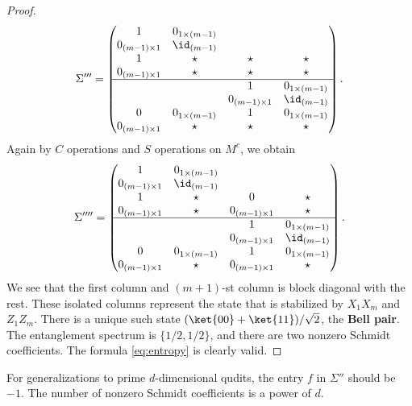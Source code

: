 \begin{proof}
\begin{align*}
 \Sigma''' =
\begin{pmatrix}
1                  & 0_{1 \times (m-1)} &  &  \\
0_{(m-1) \times 1} & \id_{(m-1)}        &  &  \\
1              & \star & \star & \star \\
0_{(m-1) \times 1} & \star        & \star & \star \\
\hline
 &  & 1 & 0_{1 \times (m-1)} \\
 &  & 0_{(m-1) \times 1} & \id_{(m-1)}\\
0              & 0_{1 \times (m-1)} & 1 & 0_{1 \times (m-1)} \\
0_{(m-1)\times 1} & \star        & \star & \star
\end{pmatrix}.
\end{align*}
Again by $C$ operations and $S$ operations on $M^c$, we obtain
\begin{align*}
 \Sigma'''' =
\begin{pmatrix}
1                  & 0_{1 \times (m-1)} &  &  \\
0_{(m-1) \times 1} & \id_{(m-1)}        &  &  \\
1              & \star & 0 & \star \\
0_{(m-1) \times 1} & \star        & 0_{(m-1) \times 1} & \star \\
\hline
 &  & 1 & 0_{1 \times (m-1)} \\
 &  & 0_{(m-1) \times 1} & \id_{(m-1)}\\
0              & 0_{1 \times (m-1)} & 1 & 0_{1 \times (m-1)} \\
0_{(m-1)\times 1} & \star        & 0_{(m-1) \times 1} & \star
\end{pmatrix}.
\end{align*}
We see that the first column and $(m+1)$-st column
is block diagonal with the rest.
These isolated columns represent the state that is stabilized by $X_1 X_m$ and $Z_1 Z_m$.
There is a unique such state $(\ket{00} + \ket{11})/\sqrt{2}$, the {\bf Bell pair}.
The entanglement spectrum is $\{1/2,1/2\}$, and there are two nonzero Schmidt coefficients.
The formula \eqref{eq:entropy} is clearly valid.
\end{proof}

For generalizations to prime $d$-dimensional qudits,
the entry $f$ in $\Sigma''$ should be $-1$.
The number of nonzero Schmidt coefficients is a power of $d$.



